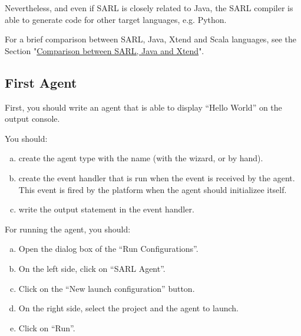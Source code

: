 \documentclass[article,english,nodocumentinfo]{utbmciadreport}
\begin{document}
Nevertheless, and even if SARL is closely related to Java, the SARL compiler is able to generate code for other target languages, e.g. Python.

For a brief comparison between SARL, Java, Xtend and Scala languages, see the Section "\href{http://www.sarl.io/docs/official/reference/OOP.html\#1-comparison-between-sarl-and-other-languages}{Comparison between SARL, Java and Xtend}".


\subsection{First Agent}

First, you should write an agent that is able to display ``Hello World'' on the output console.

You should:
\begin{enumerate}[a)]
\item create the agent type with the name  (with the wizard, or by hand).
\item create the event handler that is run when the  event is received by the agent. This event is fired by the platform when the agent should initializee itself.
\item write the output statement in the event handler.
\end{enumerate}

For running the agent, you should:
\begin{enumerate}[a)]
\item Open the dialog box of the ``Run Configurations''.
\item On the left side, click on ``SARL Agent''.
\item Click on the ``New launch configuration'' button.
\item On the right side, select the project and the agent to launch.
\item Click on ``Run''.
\end{enumerate}

\end{document}
